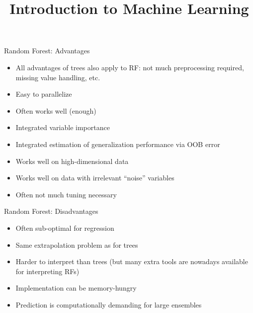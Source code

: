 \documentclass[11pt,compress,t,notes=noshow, xcolor=table]{beamer}
\title{Introduction to Machine Learning}
\begin{document}


\begin{vbframe}{Random Forest: Advantages}

\begin{itemize}
  \item All advantages of trees also apply to RF: not much preprocessing required, missing value handling, etc.
  \item Easy to parallelize
  \item Often works well (enough)
  \item Integrated variable importance
  \item Integrated estimation of generalization performance via OOB error
  \item Works well on high-dimensional data 
  \item Works well on data with irrelevant \enquote{noise} variables
  \item Often not much tuning necessary
\end{itemize}

\end{vbframe}

\begin{vbframe}{Random Forest: Disadvantages}

\begin{itemize}
  \item Often sub-optimal for regression
  \item Same extrapolation problem as for trees
  \item Harder to interpret than trees (but many extra tools are nowadays
    available for interpreting RFs)
  \item Implementation can be memory-hungry
  \item Prediction is computationally demanding for large ensembles
\end{itemize}

\end{vbframe}
\end{document}
